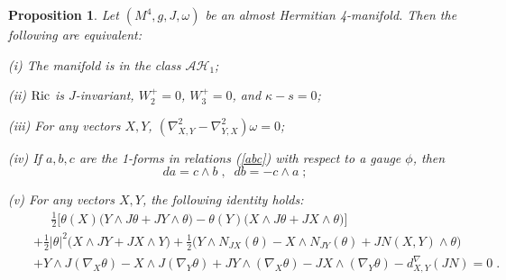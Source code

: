 \documentclass{amsart}
\newtheorem{prop}[theorem]{Proposition}
\newcommand{\La}{\Lambda}
\newcommand{\leftr}{[\hbox{\hspace{-0.15em}}[}
\newcommand{\rightr}{]\hbox{\hspace{-0.15em}}]}
\begin{document}
\begin{prop} \label{ah1-locchar}
Let $(M^4, g, J, \omega)$ be an almost Hermitian 4-manifold. Then the following are equivalent:

(i) The manifold is in the class $\mathcal{AH}_1$;

(ii) ${\rm Ric}$ is $J$-invariant, $W^+_2 = 0$, $W^+_3 = 0$, and $\kappa - s = 0$;

(iii) For any vectors $X,Y$, $(\nabla^2_{X,Y} - \nabla^2_{Y,X}) \omega = 0$;

(iv) 
If $a, b, c$ are the 1-forms in relations (\ref{abc}) with respect to a gauge $\phi$, then 
$$da = c \wedge b \; , \; \; db = - c\wedge a \; ;$$

(v) For any vectors $X, Y$, the following identity  holds:
\begin{eqnarray} \label{invAH1-v2}
    & & \; \; \; \; \;   \frac{1}{2} \Big[ \theta(X) \big( Y \wedge J \theta + JY \wedge \theta \big)  - \theta(Y) \big( X \wedge J \theta + JX \wedge \theta \big) \Big] \\ \nonumber
    & &  + \frac{1}{2} |\theta|^2 \big( X \wedge J Y + JX \wedge Y \big) + \frac{1}{2} \Big( Y\wedge N_{JX}(\theta) - X\wedge N_{JY}(\theta) + JN(X,Y) \wedge \theta \Big)
    \\ \nonumber
      & & + Y \wedge J(\nabla_X \theta) - X \wedge J(\nabla_Y \theta) + JY \wedge (\nabla_X \theta) - JX \wedge (\nabla_Y \theta) - d^{\nabla}_{X,Y}(JN)  = 0\; . 
\end{eqnarray} 
\end{prop} 
\end{document}
